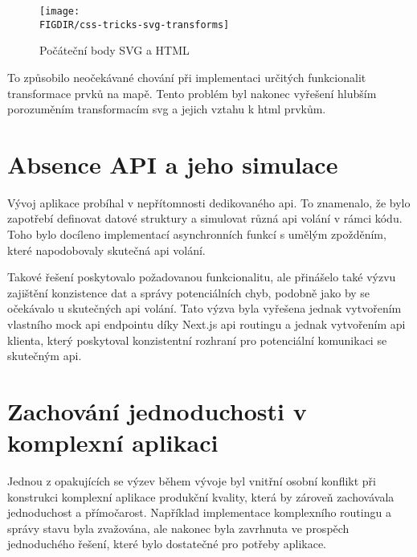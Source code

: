 \begin{figure}[H]
    \centering
    \caption{Počáteční body SVG a HTML}
    \texttt{[image: \\FIGDIR/css-tricks-svg-transforms]}
    \label{fig:css-tricks-svg-transforms}
\end{figure}

To způsobilo neočekávané chování při implementaci určitých funkcionalit transformace prvků na mapě.
Tento problém byl nakonec vyřešení hlubším porozuměním transformacím \ac{svg} a jejich vztahu k \ac{html} prvkům.



\section{Absence API a jeho simulace}
\label{sec:vyzvy-a-problemy-absence-api}
Vývoj aplikace probíhal v nepřítomnosti dedikovaného \ac{api}.
To znamenalo, že bylo zapotřebí definovat datové struktury a simulovat různá \ac{api} volání v rámci kódu.
Toho bylo docíleno implementací asynchronních funkcí s umělým zpožděním, které napodobovaly skutečná \ac{api} volání.

Takové řešení poskytovalo požadovanou funkcionalitu, ale přinášelo také výzvu zajištění konzistence dat a správy potenciálních chyb, podobně jako by se očekávalo u skutečných \ac{api} volání.
Tato výzva byla vyřešena jednak vytvořením vlastního mock \ac{api} endpointu díky Next.js \ac{api} routingu\cite{n_basics_api_routes} a jednak vytvořením \ac{api} klienta, který poskytoval konzistentní rozhraní pro potenciální komunikaci se skutečným \ac{api}.



\section{Zachování jednoduchosti v komplexní aplikaci}
\label{sec:vyzvy-a-problemy-zachovani-jednoduchosti}
Jednou z opakujících se výzev během vývoje byl vnitřní osobní konflikt při konstrukci komplexní aplikace produkční kvality, která by zároveň zachovávala jednoduchost a přímočarost.
Například implementace komplexního routingu a správy stavu byla zvažována, ale nakonec byla zavrhnuta ve prospěch jednoduchého řešení, které bylo dostatečné pro potřeby aplikace.

